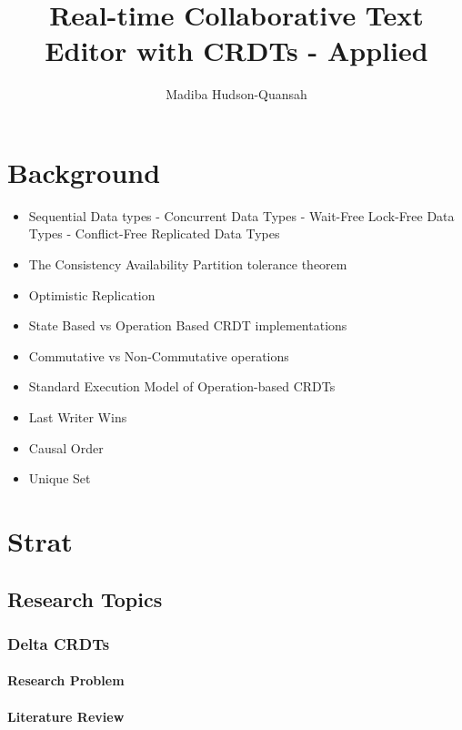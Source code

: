 \documentclass[12pt letter]{report}
\title{\Huge{Real-time Collaborative Text Editor with CRDTs - Applied }}
\author{\huge{Madiba Hudson-Quansah}}
\date{}
\begin{document}
\maketitle
\newpage
{}
\tableofcontents
\pagebreak

\chapter{Background}

\begin{itemize}
  \item Sequential Data types - Concurrent Data Types - Wait-Free Lock-Free Data Types - Conflict-Free Replicated Data
        Types
  \item The Consistency Availability Partition tolerance theorem
  \item Optimistic Replication
  \item State Based vs Operation Based CRDT implementations
  \item Commutative vs Non-Commutative operations
  \item Standard Execution Model of Operation-based CRDTs
  \item Last Writer Wins
  \item Causal Order
  \item Unique Set
\end{itemize}

\chapter{Strat}

\section{Research Topics}

\subsection{Delta CRDTs}

\subsubsection{Research Problem}

\subsubsection{Literature Review}


\end{document}
